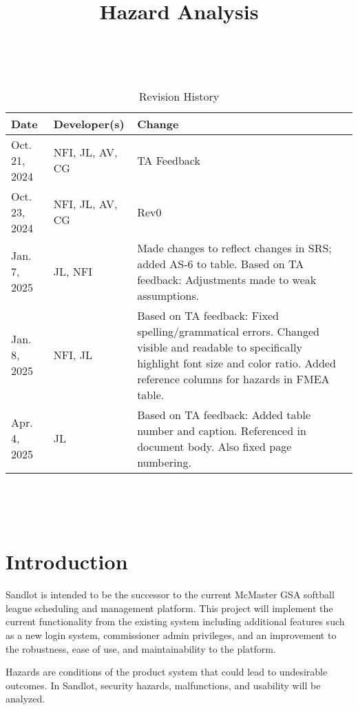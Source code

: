 \documentclass{article}
\title{Hazard Analysis\\\progname}
\author{\authname}
\date{}
\begin{document}
\maketitle
\thispagestyle{empty}

~\newpage


\begin{table}[hp]
\caption{Revision History} \label{TblRevisionHistory}
\begin{tabularx}{\textwidth}{llX}
\toprule
\textbf{Date} & \textbf{Developer(s)} & \textbf{Change}\\
\midrule
Oct. 21, 2024 & NFI, JL, AV, CG & TA Feedback\\
Oct. 23, 2024 & NFI, JL, AV, CG & Rev0\\
Jan. 7, 2025 & JL, NFI & Made changes to reflect changes in SRS; added AS-6 to table.
Based on TA feedback: Adjustments made to weak assumptions.\\
Jan. 8, 2025 & NFI, JL & Based on TA feedback: Fixed spelling/grammatical errors.
Changed visible and readable to specifically highlight font size and color ratio. Added reference columns for hazards in FMEA table.\\
Apr. 4, 2025 & JL & Based on TA feedback: Added table number and caption. Referenced in 
document body. Also fixed page numbering.\\
\bottomrule
\end{tabularx}
\end{table}

~\newpage

\tableofcontents

~\newpage


\section{Introduction}

Sandlot is intended to be the successor to the current McMaster GSA
softball league scheduling and management platform. This project
will implement the current functionality from the existing system including
additional features such as a new login system, commissioner admin
privileges, and an improvement to the robustness, ease of use, and
maintainability to the platform.

Hazards are conditions of the product system that could lead to undesirable outcomes. 
In Sandlot, security hazards, malfunctions, and usability will be analyzed.
\end{document}
